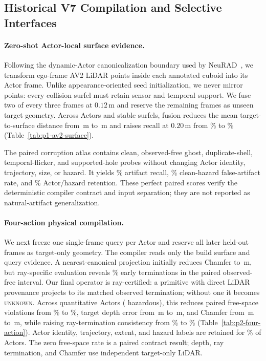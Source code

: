 

\subsection{Historical V7 Compilation and Selective Interfaces}

\paragraph{Zero-shot Actor-local surface evidence.}
Following the dynamic-Actor canonicalization boundary used by NeuRAD~\cite{tonderski2024neurad}, we transform ego-frame AV2
LiDAR points inside each annotated cuboid into its Actor frame. Unlike appearance-oriented seed initialization, we never mirror
points: every collision surfel must retain sensor and temporal support. We fuse two of every three frames at $0.12$\,m and reserve
the remaining frames as unseen target geometry. Across \PoneActors{} Actors and \PoneSurfels{} stable surfels, fusion reduces the
mean target-to-surface distance from \PoneSingleDistance{}\,m to \PoneFusedDistance{}\,m and raises recall at $0.20$\,m from
\PoneSingleRecall{}\% to \PoneFusedRecall{}\% (Table~\ref{tab:p1-av2-surface}).

The paired corruption atlas contains clean, observed-free ghost, duplicate-shell, temporal-flicker, and supported-hole probes
without changing Actor identity, trajectory, size, or hazard. It yields \PoneArtifactRecall{}\% artifact recall,
\PoneHazardFA{}\% clean-hazard false-artifact rate, and \PoneActorRetention{}\% Actor/hazard retention. These perfect paired
scores verify the deterministic compiler contract and input separation; they are not reported as natural-artifact generalization.



\paragraph{Four-action physical compilation.}
We next freeze one single-frame query per Actor and reserve all later held-out frames as target-only geometry. The compiler
reads only the build surface and query evidence. A nearest-canonical projection initially reduces Chamfer to
\PtwoChamferAfter{}\,m, but ray-specific evaluation reveals \PthreeFreeNearest{}\% early terminations in the paired observed-free
interval. Our final operator is ray-certified: a primitive with direct LiDAR provenance projects to its matched observed
termination; without one it becomes \textsc{unknown}. Across \PtwoActors{} quantitative Actors (\PtwoHazardActors{} hazardous),
this reduces paired free-space violations from \PthreeFreeBefore{}\% to \PthreeFreeAfter{}\%, target depth error from
\PthreeDepthBefore{}\,m to \PthreeDepthAfter{}\,m, and Chamfer from \PtwoChamferBefore{}\,m to \PthreeChamferAfter{}\,m,
while raising ray-termination consistency from \PthreeRayBefore{}\% to \PthreeRayAfter{}\% (Table~\ref{tab:p2-four-action}).
Actor identity, trajectory, extent, and hazard labels are retained for \PtwoActorRetention{}\% of Actors. The zero free-space
rate is a paired contract result; depth, ray termination, and Chamfer use independent target-only LiDAR.

